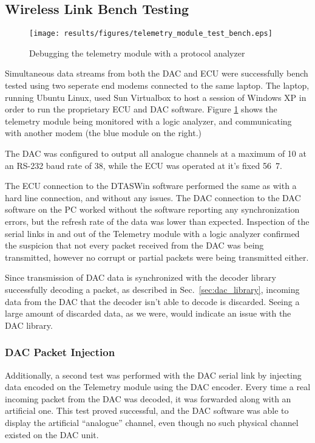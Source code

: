 \subsection{Wireless Link Bench Testing}

\begin{figure}[htp]
 \centering
 \texttt{[image: results/figures/telemetry\_module\_test\_bench.eps]}
 \caption{Debugging the telemetry module with a protocol analyzer}
 \label{fig:telemetry_bench_test}
\end{figure}


Simultaneous data streams from both the DAC and ECU were successfully bench tested using two seperate end modems connected to the same laptop. The laptop, running Ubuntu Linux, used Sun Virtualbox to host a session of Windows XP in order to run the proprietary ECU and DAC software. Figure \ref{fig:telemetry_bench_test} shows the telemetry module being monitored with a logic analyzer, and communicating with another modem (the blue module on the right.)

The DAC was configured to output all analogue channels at a maximum of \unit{10}{\hertz} at an RS-232 baud rate of \unit{38}{\kilo\bit\per\second}, while the ECU was operated at it's fixed \unit{56.7}{\kilo\bit\per\second}.

The ECU connection to the DTASWin software performed the same as with a hard line connection, and without any issues. The DAC connection to the DAC software on the PC worked without the software reporting any synchronization errors, but the refresh rate of the data was lower than expected. Inspection of the serial links in and out of the Telemetry module with a logic analyzer confirmed the suspicion that not every packet received from the DAC was being transmitted, however no corrupt or partial packets were being transmitted either.

Since transmission of DAC data is synchronized with the decoder library successfully decoding a packet, as described in Sec.\ \ref{sec:dac_library}, incoming data from the DAC that the decoder isn't able to decode is discarded. Seeing a large amount of discarded data, as we were, would indicate an issue with the DAC library.

\subsubsection{DAC Packet Injection}

Additionally, a second test was performed with the DAC serial link by injecting data encoded on the Telemetry module using the DAC encoder. Every time a real incoming packet from the DAC was decoded, it was forwarded along with an artificial one. This test proved successful, and the DAC software was able to display the artificial ``analogue'' channel, even though no such physical channel existed on the DAC unit.